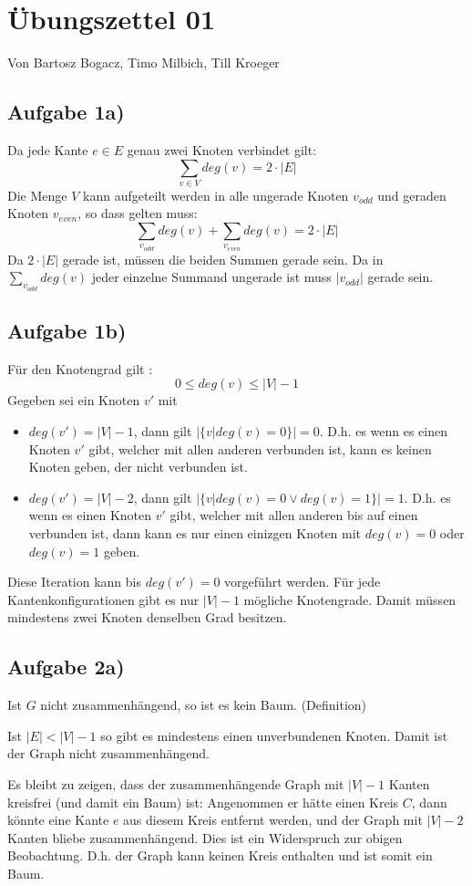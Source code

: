 \documentclass{article}
\begin{document}
\section*{Übungszettel 01}
Von Bartosz Bogacz, Timo Milbich, Till Kroeger

\subsection*{Aufgabe 1a)}     
Da jede Kante $e \in E$ genau zwei Knoten verbindet gilt: $$\sum_{v \in V} deg(v) = 2 \cdot |E|$$
Die Menge $V$ kann aufgeteilt werden in alle ungerade Knoten $v_{odd}$ und geraden Knoten $v_{even}$, so dass gelten muss: 
$$\sum_{v_{odd}} deg(v) + \sum_{v_{even}} deg(v) = 2 \cdot |E|$$
Da $2 \cdot |E|$ gerade ist, müssen die beiden Summen gerade sein. Da in $\sum_{v_{odd}} deg(v)$ jeder einzelne Summand ungerade ist muss $|v_{odd}|$ gerade sein.

\subsection*{Aufgabe 1b)}     
Für den Knotengrad gilt : $$0 \leq deg(v) \leq |V| -1$$
Gegeben sei ein Knoten $v'$ mit 
\begin{itemize}
 \item $deg(v') = |V| -1$, dann gilt $|\{v | deg(v)=0\}| = 0$. D.h. es wenn es einen Knoten $v'$ gibt, welcher mit allen anderen verbunden ist, kann es keinen Knoten geben, der nicht verbunden ist.
\item $deg(v') = |V| - 2$, dann gilt $|\{v | deg(v)=0 \vee deg(v)= 1 \}| = 1$. D.h. es wenn es einen Knoten $v'$ gibt, welcher mit allen anderen bis auf einen verbunden ist, dann kann es nur einen einizgen Knoten mit $deg(v) = 0$ oder $deg(v) = 1$ geben.
\end{itemize}
Diese Iteration kann bis $deg(v') = 0$ vorgeführt werden. Für jede Kantenkonfigurationen gibt es nur $|V| - 1$ mögliche Knotengrade. Damit müssen mindestens zwei Knoten denselben Grad besitzen.
\subsection*{Aufgabe 2a)}     
Ist $G$ nicht zusammenhängend, so ist es kein Baum. (Definition)

Ist $|E| < |V| - 1$ so gibt es mindestens einen unverbundenen Knoten. Damit ist der Graph nicht zusammenhängend.


Es bleibt zu zeigen, dass der zusammenhängende Graph mit $|V| -1$ Kanten kreisfrei (und damit ein Baum) ist: Angenommen er hätte einen Kreis $C$, dann könnte eine Kante $e$ aus diesem Kreis entfernt werden, und der Graph mit $|V| -2$ Kanten bliebe zusammenhängend. Dies ist ein Widerspruch zur obigen Beobachtung. D.h. der Graph kann keinen Kreis enthalten und ist somit ein Baum.
\end{document}
